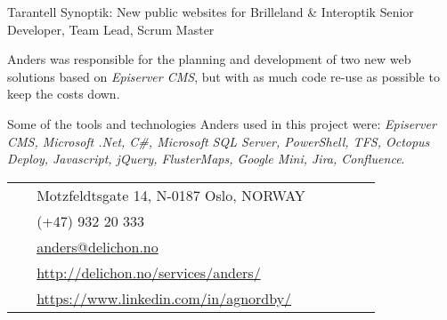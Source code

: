 \documentclass[10pt]{article} %
\begin{document}
\begin{paracol}{2}
{Tarantell} 
{Synoptik: New public websites for Brilleland \& Interoptik} 
{Senior Developer, Team Lead, Scrum Master} 
{Anders was responsible for the planning and development of two new web solutions based on \textit{Episerver CMS}, but with as much code re-use as possible to keep the costs down.

\qquad Some of the tools and technologies Anders used in this project were: \textit{Episerver CMS, Microsoft .Net, C\#, Microsoft SQL Server, PowerShell, TFS, Octopus Deploy, Javascript, jQuery, FlusterMaps, Google Mini, Jira, Confluence}.} 


\vspace{-\baselineskip}\medskip %

\switchcolumn %


\parbox[top][0.12\textheight][c]{\linewidth}{ %
	\vspace{-0.04\textheight} %
	\colorbox{shade}{ %
		\begin{supertabular}{p{0.05\linewidth}|p{0.775\linewidth}} %
			\raisebox{-1pt}{\faHome} & Motzfeldtsgate 14, N-0187 Oslo, NORWAY \\ %
			\raisebox{-1pt}{\faPhone} & (+47) 932 20 333 \\ %
			\raisebox{0pt}{\small\faEnvelope} & \href{mailto:anders@delichon.no}{anders@delichon.no} \\ %
			\raisebox{-1pt}{\small\faDesktop} & \href{http://delichon.no/services/anders/}{http://delichon.no/services/anders/} \\ %
			\raisebox{-1pt}{\faLinkedinSquare} & \href{https://www.linkedin.com/in/agnordby/}{https://www.linkedin.com/in/agnordby/} \\ %
		\end{supertabular}
	}
}


\end{paracol}
\end{document}
